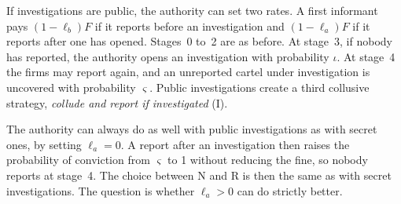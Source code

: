 If investigations are public, the authority can set two rates. A first informant pays $(1-\ell_b)F$ if it reports
before an investigation and $(1-\ell_a)F$ if it reports after one has opened. Stages~0 to~2 are as before. At
stage~3, if nobody has reported, the authority opens an investigation with probability $\iota$. At stage~4 the firms
may report again, and an unreported cartel under investigation is uncovered with probability $\varsigma$. Public investigations create a third collusive strategy, \emph{collude and report if
investigated} (I).

The authority can always do as well with public investigations as with secret ones, by setting $\ell_a = 0$. A report
after an investigation then raises the probability of conviction from $\varsigma$ to 1 without reducing the fine, so
nobody reports at stage~4. The choice between N and R is then the same as with secret investigations. The question is
whether $\ell_a > 0$ can do strictly better.

